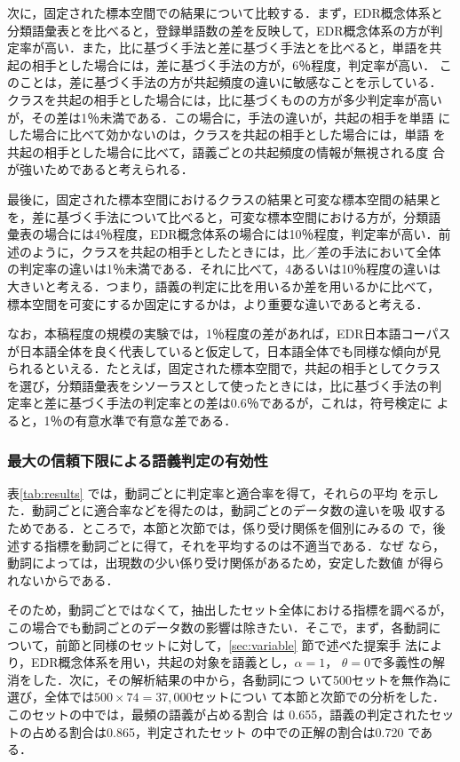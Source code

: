 次に，固定された標本空間での結果について比較する．まず，EDR概念体系と
分類語彙表とを比べると，登録単語数の差を反映して，EDR概念体系の方が判
定率が高い．また，比に基づく手法と差に基づく手法とを比べると，単語を共
起の相手とした場合には，差に基づく手法の方が，6％程度，判定率が高い．
このことは，差に基づく手法の方が共起頻度の違いに敏感なことを示している．
クラスを共起の相手とした場合には，比に基づくものの方が多少判定率が高い
が，その差は1％未満である．この場合に，手法の違いが，共起の相手を単語
にした場合に比べて効かないのは，クラスを共起の相手とした場合には，単語
を共起の相手とした場合に比べて，語義ごとの共起頻度の情報が無視される度
合が強いためであると考えられる．

最後に，固定された標本空間におけるクラスの結果と可変な標本空間の結果と
を，差に基づく手法について比べると，可変な標本空間における方が，分類語
彙表の場合には4％程度，EDR概念体系の場合には10％程度，判定率が高い．前
述のように，クラスを共起の相手としたときには，比／差の手法において全体
の判定率の違いは1％未満である．それに比べて，4あるいは10％程度の違いは
大きいと考える．つまり，語義の判定に比を用いるか差を用いるかに比べて，
標本空間を可変にするか固定にするかは，より重要な違いであると考える．

なお，本稿程度の規模の実験では，1％程度の差があれば，EDR日本語コーパス
が日本語全体を良く代表していると仮定して，日本語全体でも同様な傾向が見
られるといえる．たとえば，固定された標本空間で，共起の相手としてクラス
を選び，分類語彙表をシソーラスとして使ったときには，比に基づく手法の判
定率と差に基づく手法の判定率との差は0.6％であるが，これは，符号検定に
よると，1％の有意水準で有意な差である．

\subsubsection{最大の信頼下限による語義判定の有効性}

表\ref{tab:results} では，動詞ごとに判定率と適合率を得て，それらの平均
を示した．動詞ごとに適合率などを得たのは，動詞ごとのデータ数の違いを吸
収するためである．ところで，本節と次節では，係り受け関係を個別にみるの
で，後述する指標を動詞ごとに得て，それを平均するのは不適当である．なぜ
なら，動詞によっては，出現数の少い係り受け関係があるため，安定した数値
が得られないからである．

そのため，動詞ごとではなくて，抽出したセット全体における指標を調べるが，
この場合でも動詞ごとのデータ数の影響は除きたい．そこで，まず，各動詞に
ついて，前節と同様のセットに対して，\ref{sec:variable} 節で述べた提案手
法により，EDR概念体系を用い，共起の対象を語義とし，$\alpha=1$，
$\theta=0$で多義性の解消をした．次に，その解析結果の中から，各動詞につ
いて500セットを無作為に選び，全体では$500\times74=37,000$セットについ
て本節と次節での分析をした．このセットの中では，最頻の語義が占める割合
は 0.655，語義の判定されたセットの占める割合は0.865，判定されたセット
の中での正解の割合は0.720 である．

